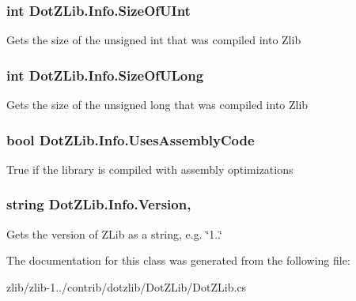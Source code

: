 \hypertarget{class_dot_z_lib_1_1_info_ad1144085a3156ff5f2a4f8eca5e0b8af}{
\subsubsection[{Size\+Of\+U\+Int}]{\setlength{\rightskip}{0pt plus 5cm}int Dot\+Z\+Lib.\+Info.\+Size\+Of\+U\+Int\hspace{0.3cm}{\ttfamily [get]}}}\label{class_dot_z_lib_1_1_info_ad1144085a3156ff5f2a4f8eca5e0b8af}


Gets the size of the unsigned int that was compiled into Zlib 

\hypertarget{class_dot_z_lib_1_1_info_a1367f8d9234f03365f4431bc72cd3f26}{
\subsubsection[{Size\+Of\+U\+Long}]{\setlength{\rightskip}{0pt plus 5cm}int Dot\+Z\+Lib.\+Info.\+Size\+Of\+U\+Long\hspace{0.3cm}{\ttfamily [get]}}}\label{class_dot_z_lib_1_1_info_a1367f8d9234f03365f4431bc72cd3f26}


Gets the size of the unsigned long that was compiled into Zlib 

\hypertarget{class_dot_z_lib_1_1_info_af40b6921a94f038094510d56e11a93e5}{
\subsubsection[{Uses\+Assembly\+Code}]{\setlength{\rightskip}{0pt plus 5cm}bool Dot\+Z\+Lib.\+Info.\+Uses\+Assembly\+Code\hspace{0.3cm}{\ttfamily [get]}}}\label{class_dot_z_lib_1_1_info_af40b6921a94f038094510d56e11a93e5}


True if the library is compiled with assembly optimizations 

\hypertarget{class_dot_z_lib_1_1_info_a0b74ff8a7c918ea7d8c76f5ddc834179}{
\subsubsection[{Version}]{\setlength{\rightskip}{0pt plus 5cm}string Dot\+Z\+Lib.\+Info.\+Version\hspace{0.3cm}{\ttfamily [static]}, {\ttfamily [get]}}}\label{class_dot_z_lib_1_1_info_a0b74ff8a7c918ea7d8c76f5ddc834179}


Gets the version of Z\+Lib as a string, e.\+g. \char`\"{}1..\char`\"{} 



The documentation for this class was generated from the following file\+:\begin{DoxyCompactItemize}
\item 
zlib/zlib-\/1../contrib/dotzlib/\+Dot\+Z\+Lib/Dot\+Z\+Lib.\+cs\end{DoxyCompactItemize}
